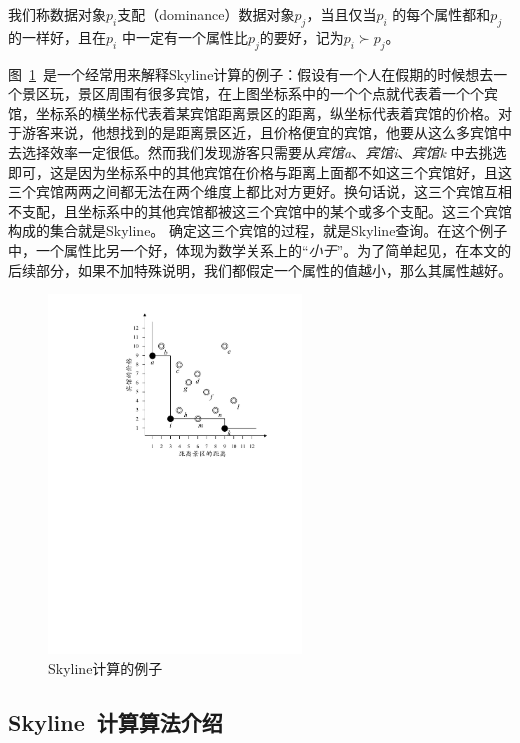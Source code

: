 \begin{definition}[支配]
    我们称数据对象$p_{i}$支配（dominance）数据对象$p_{j}$，当且仅当$p_{i}$ 的每个属性都和$p_{j}$的一样好，且在$p_{i}$ 中一定有一个属性比$p_{j}$的要好，记为$p_{i} \succ p_{j}$。
\end{definition}

图~\ref{F:Fig_SkylineHotel}~是一个经常用来解释Skyline计算的例子：假设有一个人在假期的时候想去一个景区玩，景区周围有很多宾馆，在上图坐标系中的一个个点就代表着一个个宾馆，坐标系的横坐标代表着某宾馆距离景区的距离，纵坐标代表着宾馆的价格。对于游客来说，他想找到的是距离景区近，且价格便宜的宾馆，他要从这么多宾馆中去选择效率一定很低。然而我们发现游客只需要从\emph{宾馆a}、\emph{宾馆i}、\emph{宾馆k} 中去挑选即可，这是因为坐标系中的其他宾馆在价格与距离上面都不如这三个宾馆好，且这三个宾馆两两之间都无法在两个维度上都比对方更好。换句话说，这三个宾馆互相不支配，且坐标系中的其他宾馆都被这三个宾馆中的某个或多个支配。这三个宾馆构成的集合就是Skyline。 确定这三个宾馆的过程，就是Skyline查询。在这个例子中，一个属性比另一个好，体现为数学关系上的``\emph{小于}''。为了简单起见，在本文的后续部分，如果不加特殊说明，我们都假定一个属性的值越小，那么其属性越好。

\begin{figure}[thb]
    \centering
    \includegraphics[width=0.6\textwidth]{./FIGs/Fig_SkylineHotel.pdf}
    \caption{Skyline计算的例子}
    \label{F:Fig_SkylineHotel}
\end{figure}

\subsection{Skyline~计算算法介绍}

